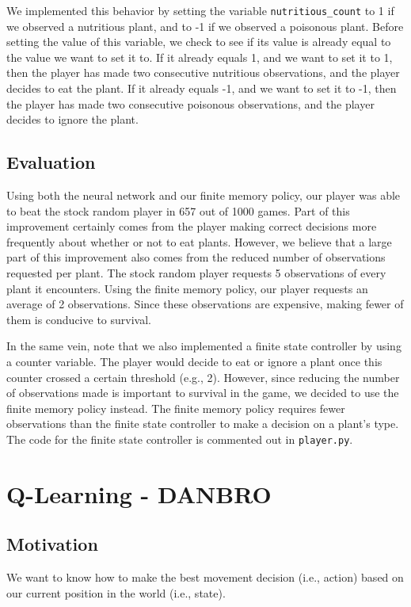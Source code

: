 \documentclass[solution, letterpaper]{cs121}
\begin{document}
We implemented this behavior by setting the variable {\tt nutritious\_count} to 1 if we observed a nutritious plant, and to -1 if we observed a poisonous plant. Before setting the value of this variable, we check to see if its value is already equal to the value we want to set it to. If it already equals 1, and we want to set it to 1, then the player has made two consecutive nutritious observations, and the player decides to eat the plant. If it already equals -1, and we want to set it to -1, then the player has made two consecutive poisonous observations, and the player decides to ignore the plant.

\subsection{Evaluation}
Using both the neural network and our finite memory policy, our player was able to beat the stock random player in 657 out of 1000 games. Part of this improvement certainly comes from the player making correct decisions more frequently about whether or not to eat plants. However, we believe that a large part of this improvement also comes from the reduced number of observations requested per plant. The stock random player requests 5 observations of every plant it encounters. Using the finite memory policy, our player requests an average of 2 observations. Since these observations are expensive, making fewer of them is conducive to survival.

In the same vein, note that we also implemented a finite state controller by using a counter variable. The player would decide to eat or ignore a plant once this counter crossed a certain threshold (e.g., 2). However, since reducing the number of observations made is important to survival in the game, we decided to use the finite memory policy instead. The finite memory policy requires fewer observations than the finite state controller to make a decision on a plant's type. The code for the finite state controller is commented out in {\tt player.py}.

\section{Q-Learning - DANBRO}
\subsection{Motivation}
We want to know how to make the best movement decision (i.e., action) based on our current position in the world (i.e., state).
\end{document}
